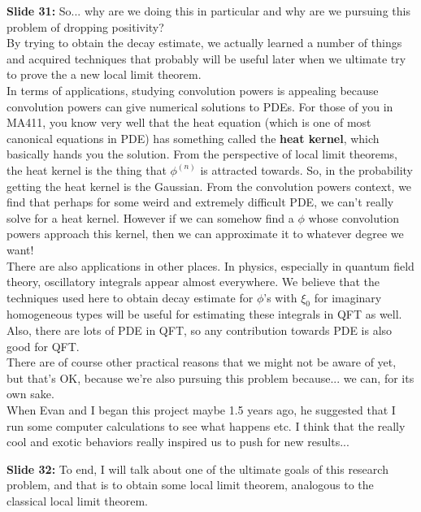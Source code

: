 \documentclass[11pt]{article}
\begin{document}
\noindent \textbf{Slide 31:} So... why are we doing this in particular and why are we pursuing this problem of dropping positivity? \\

By trying to obtain the decay estimate, we actually learned a number of things and acquired techniques that probably will be useful later when we ultimate try to prove the a new local limit theorem.\\


In terms of applications, studying convolution powers is appealing because convolution powers can give numerical solutions to PDEs. For those of you in MA411, you know very well that the heat equation (which is one of most canonical equations in PDE) has something called the \textbf{heat kernel}, which basically hands you the solution. From the perspective of local limit theorems, the heat kernel is the thing that $\phi^{(n)}$ is attracted towards. So, in the probability getting the heat kernel is the Gaussian. From the convolution powers context, we find that perhaps for some weird and extremely difficult PDE, we can't really solve for a heat kernel. However if we can somehow find a $\phi$ whose convolution powers approach this kernel, then we can approximate it to whatever degree we want!\\


There are also applications in other places. In physics, especially in quantum field theory, oscillatory integrals appear almost everywhere. We believe that the techniques used here to obtain decay estimate for $\phi$'s with $\xi_0$ for imaginary homogeneous types will be useful for estimating these integrals in QFT as well. Also, there are lots of PDE in QFT, so any contribution towards PDE is also good for QFT.\\


There are of course other practical reasons that we might not be aware of yet, but that's OK, because we're also pursuing this problem because... we can, for its own sake. \\


When Evan and I began this project maybe 1.5 years ago, he suggested that I run some computer calculations to see what happens etc. I think that the really cool and exotic behaviors really inspired us to push for new results... 



\noindent \textbf{Slide 32:} To end, I will talk about one of the ultimate goals of this research problem, and that is to obtain some local limit theorem, analogous to the classical local limit theorem.  \\
\end{document}
